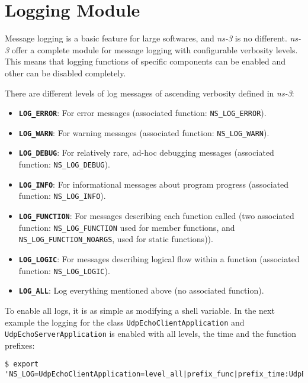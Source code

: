 \section{Logging Module}
Message logging is a basic feature for large softwares, and \textit{ns-3} is no different. \textit{ns-3} 
offer a complete module for message logging with configurable verbosity levels. This means that logging 
functions of specific components can be enabled and other can be disabled completely.

There are different levels of log messages of ascending verbosity defined in \textit{ns-3}:

\begin{itemize}[topsep=0pt]
  \item \textbf{\texttt{LOG\_ERROR}}: For error messages (associated function: \texttt{NS\_LOG\_ERROR}).
  \item \textbf{\texttt{LOG\_WARN}}: For warning messages (associated function: \texttt{NS\_LOG\_WARN}).
  \item \textbf{\texttt{LOG\_DEBUG}}: For relatively rare, ad-hoc debugging messages (associated function: \texttt{NS\_LOG\_DEBUG}).
  \item \textbf{\texttt{LOG\_INFO}}: For informational messages about program progress (associated function: \texttt{NS\_LOG\_INFO}).
  \item \textbf{\texttt{LOG\_FUNCTION}}: For messages describing each function called (two associated function: \texttt{NS\_LOG\_FUNCTION}
  used for member functions, and \texttt{NS\_LOG\_FUNCTION\_NOARGS}, used for static functions)).
  \item \textbf{\texttt{LOG\_LOGIC}}: For messages describing logical flow within a function (associated function: \texttt{NS\_LOG\_LOGIC}).
  \item \textbf{\texttt{LOG\_ALL}}: Log everything mentioned above (no associated function).
\end{itemize}

To enable all logs, it is as simple as modifying a shell variable. In the next example the logging for the class
\texttt{UdpEchoClientApplication} and \texttt{UdpEchoServerApplication} is enabled with all levels, the time 
and the function prefixes:

\begin{lstlisting}[escapechar=@, language=myshell,caption={Enabling logging in ns-3}, captionpos=b]
  $ export 'NS_LOG=UdpEchoClientApplication=level_all|prefix_func|prefix_time:UdpEchoServerApplication=level_all|prefix_func|prefix_time'
\end{lstlisting}

